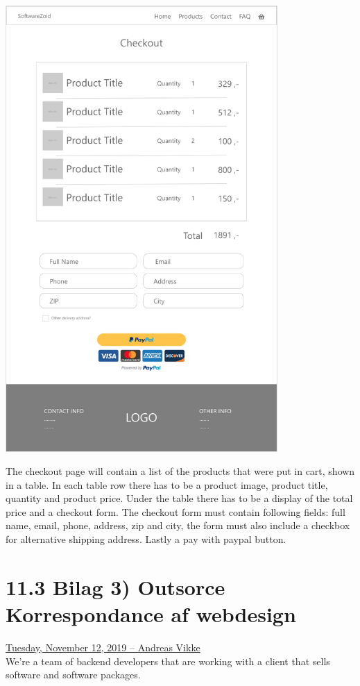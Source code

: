 \documentclass[11pt]{report}
\begin{document}
\begin{center}
\includegraphics[height=17cm]{page7}
\end{center}
\noindent The checkout page will contain a list of the products that were put in cart, shown in a table. In each table row there has to be a product image, product title, quantity and product price. Under the table there has to be a display of the total price and a checkout form. The checkout form must contain following fields: full name, email, phone, address, zip and city, the form must also include a checkbox for alternative shipping address. Lastly a pay with paypal button.

\newpage
\section*{11.3 Bilag 3) Outsorce Korrespondance af webdesign}

\noindent\underline{Tuesday, November 12, 2019 – Andreas Vikke}\\
\noindent We're a team of backend developers that are working with a client that sells software and software packages.
\end{document}
